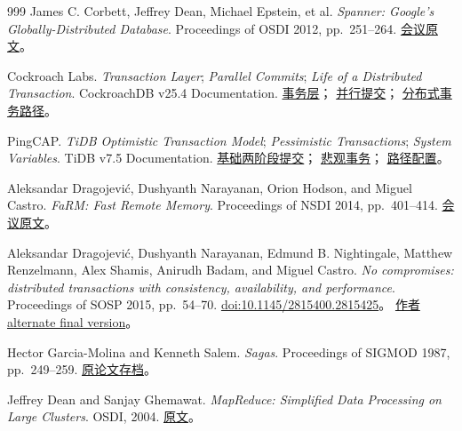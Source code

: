\begin{thebibliography}{999}
James C. Corbett, Jeffrey Dean, Michael Epstein, et al.
\textit{Spanner: Google's Globally-Distributed Database}.
Proceedings of OSDI 2012, pp.\ 251--264.
\href{https://www.usenix.org/system/files/conference/osdi12/osdi12-final-16.pdf}{会议原文}。

Cockroach Labs.
\textit{Transaction Layer}; \textit{Parallel Commits}; \textit{Life of a Distributed Transaction}.
CockroachDB v25.4 Documentation.
\href{https://www.cockroachlabs.com/docs/v25.4/architecture/transaction-layer}{事务层}；
\href{https://www.cockroachlabs.com/docs/v25.4/architecture/transaction-layer#parallel-commits}{并行提交}；
\href{https://www.cockroachlabs.com/docs/v25.4/architecture/life-of-a-distributed-transaction}{分布式事务路径}。

PingCAP.
\textit{TiDB Optimistic Transaction Model}; \textit{Pessimistic Transactions};
\textit{System Variables}. TiDB v7.5 Documentation.
\href{https://docs.pingcap.com/tidb/v7.5/optimistic-transaction/}{基础两阶段提交}；
\href{https://docs.pingcap.com/tidb/v7.5/pessimistic-transaction/}{悲观事务}；
\href{https://docs.pingcap.com/tidb/v7.5/system-variables/}{路径配置}。

Aleksandar Dragojević, Dushyanth Narayanan, Orion Hodson, and Miguel Castro.
\textit{FaRM: Fast Remote Memory}.
Proceedings of NSDI 2014, pp.\ 401--414.
\href{https://www.usenix.org/system/files/conference/nsdi14/nsdi14-paper-dragojevic.pdf}{会议原文}。

Aleksandar Dragojević, Dushyanth Narayanan, Edmund B. Nightingale, Matthew Renzelmann,
Alex Shamis, Anirudh Badam, and Miguel Castro.
\textit{No compromises: distributed transactions with consistency, availability, and performance}.
Proceedings of SOSP 2015, pp.\ 54--70.
\href{https://doi.org/10.1145/2815400.2815425}{doi:10.1145/2815400.2815425}。
\href{https://www.microsoft.com/en-us/research/wp-content/uploads/2016/02/SOSP15-paper227-alternate-final-version.pdf}{作者alternate final version}。

Hector Garcia-Molina and Kenneth Salem.
\textit{Sagas}.
Proceedings of SIGMOD 1987, pp.\ 249--259.
\href{https://www.cs.cornell.edu/andru/cs711/2002fa/reading/sagas.pdf}{原论文存档}。

Jeffrey Dean and Sanjay Ghemawat.
\textit{MapReduce: Simplified Data Processing on Large Clusters}.
OSDI, 2004.
\href{https://static.googleusercontent.com/media/research.google.com/en//archive/mapreduce-osdi04.pdf}{原文}。


\end{thebibliography}
